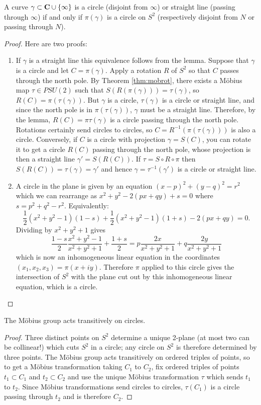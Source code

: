 \documentclass[12pt]{article}
\begin{document}
\begin{thm}
  A curve $\gamma\subset\mathbf{C}\cup\{\infty\}$ is a circle (disjoint from $\infty$) or straight line (passing through $\infty$) if and only if $\pi(\gamma)$ is a circle on $S^2$ (respectively disjoint from $N$ or passing through $N$).
\end{thm}
\begin{proof}
Here are two proofs:
\begin{enumerate}
\item If $\gamma$ is a straight line this equivalence follows from the lemma. Suppose that $\gamma$ is a circle and let $C=\pi(\gamma)$. Apply a rotation $R$ of $S^2$ so that $C$ passes through the north pole. By Theorem \ref{thm:mobrot}, there exists a M\"obius map $\tau\in PSU(2)$ such that $S(R(\pi(\gamma)))=\tau(\gamma)$, so $R(C)=\pi(\tau(\gamma))$. But $\gamma$ is a circle, $\tau(\gamma)$ is a circle or straight line, and since the north pole is in $\pi(\tau(\gamma))$, $\gamma$ must be a straight line. Therefore, by the lemma, $R(C)=\pi\tau(\gamma)$ is a circle passing through the north pole. Rotations certainly send circles to circles, so $C=R^{-1}(\pi(\tau(\gamma)))$ is also a circle. Conversely, if $C$ is a circle with projection $\gamma=S(C)$, you can rotate it to get a circle $R(C)$ passing through the north pole, whose projection is then a straight line $\gamma'=S(R(C))$. If $\tau=S\circ R\circ \pi$ then $S(R(C))=\tau(\gamma)=\gamma'$ and hence $\gamma=\tau^{-1}(\gamma')$ is a circle or straight line.

\item   A circle in the plane is given by an equation $(x-p)^2+(y-q)^2=r^2$ which we can rearrange as $x^2+y^2-2(px+qy)+s=0$ where $s=p^2+q^2-r^2$. Equivalently:
  \[\frac{1}{2}(x^2+y^2-1)(1-s)+\frac{1}{2}(x^2+y^2-1)(1+s)-2(px+qy)=0.\]
  Dividing by $x^2+y^2+1$ gives
  \[\frac{1-s}{2}\frac{x^2+y^2-1}{x^2+y^2+1}+\frac{1+s}{2}=p\frac{2x}{x^2+y^2+1}+q\frac{2y}{x^2+y^2+1}\]
  which is now an inhomogeneous linear equation in the coordinates $(x_1,x_2,x_3)=\pi(x+iy)$. Therefore $\pi$ applied to this circle gives the intersection of $S^2$ with the plane cut out by this inhomogeneous linear equation, which is a circle.
\end{enumerate}
\end{proof}

\begin{cor}
  The M\"obius group acts transitively on circles.
\end{cor}
\begin{proof}
  Three distinct points on $S^2$ determine a unique 2-plane (at most two can be collinear!) which cuts $S^2$ in a circle; any circle on $S^2$ is therefore determined by three points. The M\"obius group acts transitively on ordered triples of points, so to get a M\"obius transformation taking $C_1$ to $C_2$, fix ordered triples of points $t_1\subset C_1$ and $t_2\subset C_2$ and use the unique M\"obius transformation $\tau$ which sends $t_1$ to $t_2$. Since M\"obius transformations send circles to circles, $\tau(C_1)$ is a circle passing through $t_2$ and is therefore $C_2$.
\end{proof}
\end{document}
